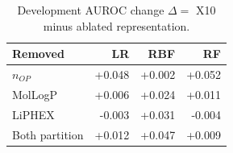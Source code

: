 \begin{table}[t]
\caption{Development AUROC change $\Delta=$ X10 minus ablated representation.}
\label{tab:ablation}
\centering
\small
\begin{tabular}{lrrr}
\toprule
Removed & LR & RBF & RF \\
\midrule
$n_{OP}$ & +0.048 & +0.002 & +0.052 \\ 
MolLogP & +0.006 & +0.024 & +0.011 \\ 
LiPHEX & -0.003 & +0.031 & -0.004 \\ 
Both partition & +0.012 & +0.047 & +0.009 \\ 
\bottomrule
\end{tabular}
\end{table}

